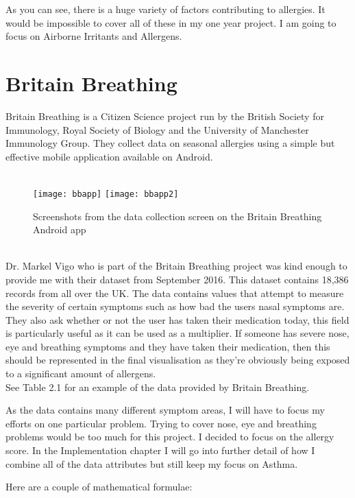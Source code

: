 As you can see, there is a huge variety of factors contributing to allergies. It would be impossible to cover all of these in my one year project. I am going to focus on Airborne Irritants and Allergens.


\section{Britain Breathing}

Britain Breathing is a Citizen Science project run by the British Society for Immunology, Royal Society of Biology and the University of Manchester Immunology Group. They collect data on seasonal allergies using a simple but effective mobile application available on Android.\\

\begin{figure}
\caption{Screenshots from the data collection screen on the Britain Breathing Android app}\\
\centering
\texttt{[image: bbapp]}
\centering
\texttt{[image: bbapp2]}
\end{figure}\\

Dr. Markel Vigo who is part of the Britain Breathing project was kind enough to provide me with their dataset from September 2016. This dataset contains 18,386 records from all over the UK. The data contains values that attempt to measure the severity of certain symptoms such as how bad the users nasal symptoms are. They also ask whether or not the user has taken their medication today, this field is particularly useful as it can be used as a multiplier. If someone has severe nose, eye and breathing symptoms and they have taken their medication, then this should be represented in the final visualisation as they're obviously being exposed to a significant amount of allergens.\\

See Table 2.1 for an example of the data provided by Britain Breathing.

As the data contains many different symptom areas, I will have to focus my efforts on one particular problem. Trying to cover nose, eye and breathing problems would be too much for this project. I decided to focus on the allergy score. In the Implementation chapter I will go into further detail of how I combine all of the data attributes but still keep my focus on Asthma.

Here are a couple of mathematical formulae:


